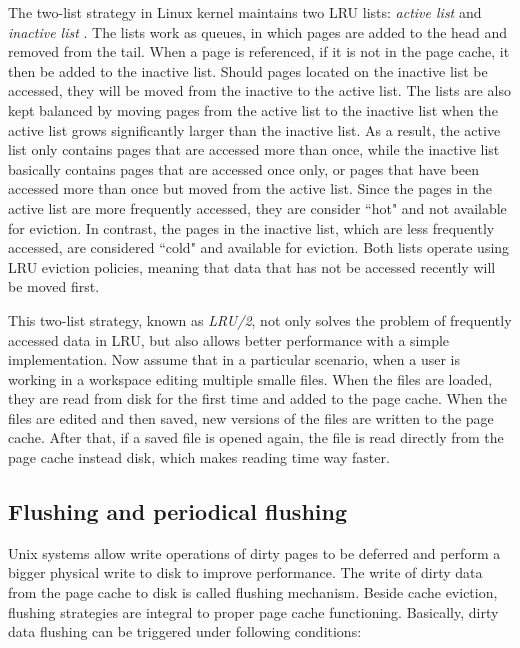 The two-list strategy in Linux kernel maintains two LRU lists: 
\textit{active list} and \textit{inactive list} 
\cite{linuxdev3rd2010,bovet2005understanding}.
The lists work as queues, in which pages are added to the head and 
removed from the tail.
When a page is referenced, if it is not in the page cache, it then be added 
to the inactive list.
Should pages located on the inactive list be accessed, they will be moved 
from the inactive to the active list. 
The lists are also kept balanced by moving pages from the active list to the 
inactive list when the active list grows significantly larger than the 
inactive list.
As a result, the active list only contains pages that are accessed more 
than once, while the inactive list basically contains pages that are accessed 
once only, or pages that have been accessed more than once but moved 
from the active list.
Since the pages in the active list are more frequently accessed, they are 
consider ``hot" and not available for eviction. In contrast, the pages in the 
inactive list, which are less frequently accessed, are considered ``cold" 
and available for eviction.
Both lists operate using LRU eviction policies, meaning that data that has
not be accessed recently will be moved first.

This two-list strategy, known as \textit{LRU/2}, not only solves the problem 
of frequently accessed data in LRU, but also allows better performance with 
a simple implementation. 
Now assume that in a particular scenario, when a user is working in a 
workspace editing multiple smalle files. When the files are loaded, they are 
read from disk for the first time and added to the page cache. 
When the files are edited and then saved, new versions of the files are 
written to the page cache.
After that, if a saved file is opened again, the file is read directly from 
the page cache instead disk, which makes reading time way faster. 

\subsection{Flushing and periodical flushing}

Unix systems allow write operations of dirty pages to be deferred and perform 
a bigger physical write to disk to improve performance. The write of 
dirty data from the page cache to disk is called flushing mechanism. 
Beside cache eviction, flushing strategies are integral to proper 
page cache functioning.
Basically, dirty data flushing can be triggered under following conditions:

